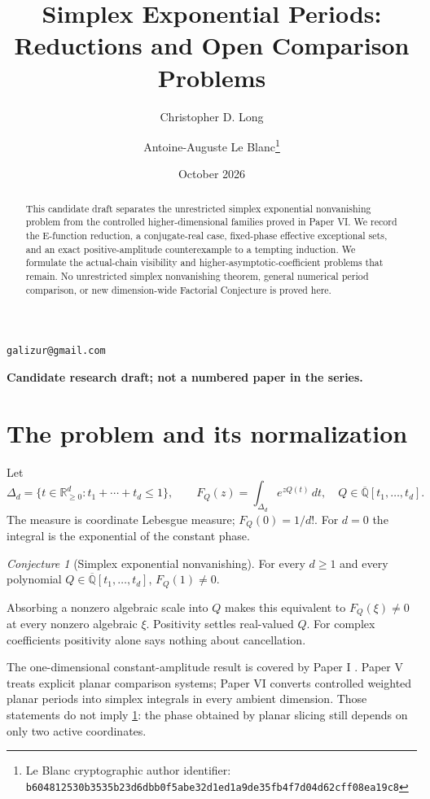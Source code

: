 \documentclass[11pt]{article}
\title{Simplex Exponential Periods: Reductions and Open Comparison Problems}
\author{Christopher D. Long \and Antoine-Auguste Le Blanc\thanks{Le Blanc cryptographic author identifier: \texttt{b6048125\allowbreak{}30b3535b\allowbreak{}23d6dbb0\allowbreak{}f5abe32d\allowbreak{}1ed1a9de\allowbreak{}35fb4f7d\allowbreak{}04d62cff\allowbreak{}08ea19c8}}}
\date{October 2026}
\numberwithin{equation}{section}
\theoremstyle{definition}
\theoremstyle{remark}
\newcommand{\Qbar}{\overline{\mathbb Q}}
\newcommand{\R}{\mathbb R}
\newtheorem{conjecture}[theorem]{Conjecture}
\begin{document}
\maketitle

\begin{center}
\small
\texttt{galizur@gmail.com}
\end{center}

\begin{abstract}
This candidate draft separates the unrestricted simplex exponential
nonvanishing problem from the controlled higher-dimensional families proved
in Paper VI. We record the E-function reduction, a conjugate-real case,
fixed-phase effective exceptional sets, and an exact positive-amplitude
counterexample to a tempting induction. We formulate the actual-chain
visibility and higher-asymptotic-coefficient problems that remain.
No unrestricted simplex nonvanishing theorem, general numerical period
comparison, or new dimension-wide Factorial Conjecture is proved here.
\end{abstract}

\begin{center}
\textbf{Candidate research draft; not a numbered paper in the series.}
\end{center}
\tableofcontents

\section{The problem and its normalization}
Let
\[
 \Delta_d=\{t\in\R_{\ge0}^{d}:t_1+\cdots+t_d\le1\},\qquad
 F_Q(z)=\int_{\Delta_d}e^{zQ(t)}\,dt,
 \quad Q\in\Qbar[t_1,\ldots,t_d].
\]
The measure is coordinate Lebesgue measure; $F_Q(0)=1/d!$.
For $d=0$ the integral is the exponential of the constant phase.

\begin{conjecture}[Simplex exponential nonvanishing]\label{conj:simplex}
For every $d\ge1$ and every polynomial $Q\in\Qbar[t_1,\ldots,t_d]$,
$F_Q(1)\ne0$.
\end{conjecture}
Absorbing a nonzero algebraic scale into $Q$ makes this equivalent to
$F_Q(\xi)\ne0$ at every nonzero algebraic $\xi$. Positivity settles
real-valued $Q$. For complex coefficients positivity alone says nothing
about cancellation.

The one-dimensional constant-amplitude result is covered by Paper I
\cite{PaperI}. Paper V \cite{PaperV} treats explicit planar comparison
systems; Paper VI \cite{PaperVI} converts controlled weighted planar
periods into simplex integrals in every ambient dimension. Those statements
do not imply \cref{conj:simplex}: the phase obtained by planar slicing
still depends on only two active coordinates.
\end{document}
